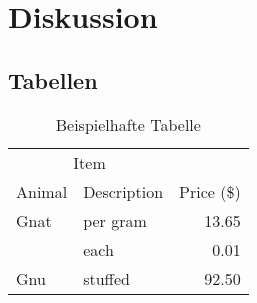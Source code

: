 \chapter{Diskussion}
\section{Tabellen}
\begin{table}[h]\centering
\caption{Beispielhafte Tabelle}
\label{tab:bsp}
\begin{tabular}{llr}
\toprule
\multicolumn{2}{c}{Item} \\
\cmidrule(r){1-2}
Animal & Description & Price (\$) \\
\midrule
Gnat  & per gram & 13.65 \\
      & each     & 0.01  \\
Gnu   & stuffed  & 92.50 \\
\bottomrule
\end{tabular}
\end{table}
